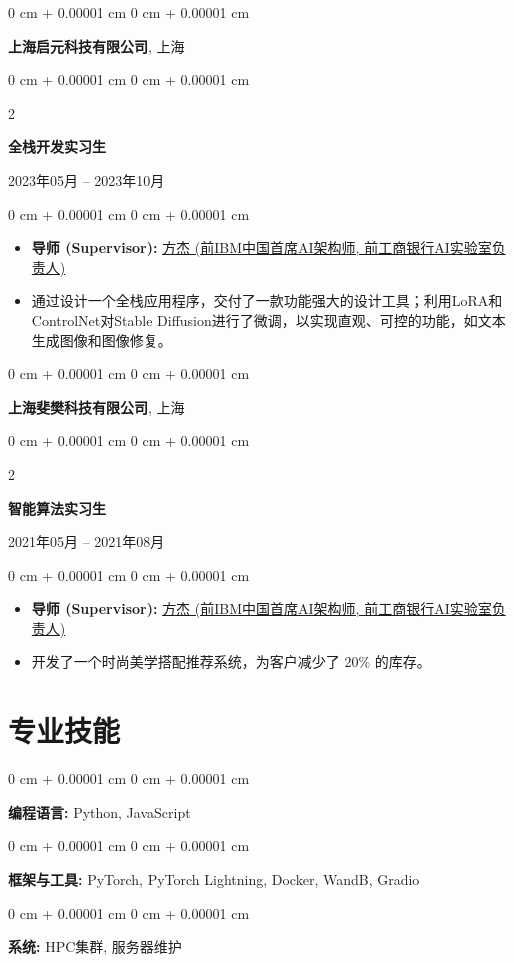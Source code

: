 \documentclass[10pt, letterpaper]{article}
\newenvironment{highlights}{
    \begin{itemize}[
        topsep=0.05 cm,
        parsep=0.05 cm,
        partopsep=0pt,
        itemsep=0pt,
        leftmargin=0.4 cm + 10pt
    ]
}{
    \end{itemize}
} %
\newenvironment{onecolentry}{
    \begin{adjustwidth}{
        0 cm + 0.00001 cm
    }{
        0 cm + 0.00001 cm
    }
}{
    \end{adjustwidth}
} %
\newenvironment{twocolentry}[2][]{
    \onecolentry
    \def\secondColumn{#2}
    \setcolumnwidth{\fill, 4.5 cm}
    \begin{paracol}{2}
}{
    \switchcolumn \raggedleft \secondColumn
    \end{paracol}
    \endonecolentry
} %
\begin{document}
    \vspace{0.2 cm}

    \begin{onecolentry}
         \large\textbf{上海启元科技有限公司}, 上海
    \end{onecolentry}
    \begin{twocolentry}{
        2023年05月 – 2023年10月
    }
       \textbf{全栈开发实习生}
    \end{twocolentry}
    \begin{onecolentry}
        \begin{highlights}
            \item \textbf{导师 (Supervisor):} \href{https://www.linkedin.com/in/jie-fang-28293740}{方杰 (前IBM中国首席AI架构师, 前工商银行AI实验室负责人)}
            \item 通过设计一个全栈应用程序，交付了一款功能强大的设计工具；利用LoRA和ControlNet对Stable Diffusion进行了微调，以实现直观、可控的功能，如文本生成图像和图像修复。
        \end{highlights}
    \end{onecolentry}

    \vspace{0.2 cm}
    
    \begin{onecolentry}
        \large\textbf{上海斐樊科技有限公司}, 上海
    \end{onecolentry}
    \begin{twocolentry}{
        2021年05月 – 2021年08月
    }
        \textbf{智能算法实习生}
    \end{twocolentry}
    \begin{onecolentry}
        \begin{highlights}
            \item \textbf{导师 (Supervisor):} \href{https://www.linkedin.com/in/jie-fang-28293740}{方杰 (前IBM中国首席AI架构师, 前工商银行AI实验室负责人)}
            \item 开发了一个时尚美学搭配推荐系统，为客户减少了 20\% 的库存。
        \end{highlights}
    \end{onecolentry}

    \section{专业技能}
        \begin{onecolentry}
            \textbf{编程语言:} Python, JavaScript
        \end{onecolentry}
        \begin{onecolentry}
            \textbf{框架与工具:} PyTorch, PyTorch Lightning, Docker, WandB, Gradio
        \end{onecolentry}
        \begin{onecolentry}
            \textbf{系统:} HPC集群, 服务器维护
        \end{onecolentry}
\end{document}
